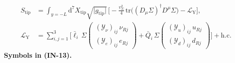 \documentclass[
  10pt,
]{article}
\begin{document}
\[
\begin{aligned}
S_{\mathrm{tip}} &= \int_{y=-L}\mathrm{d}^7X_{\mathrm{tip}}\sqrt{\lvert g_{\mathrm{tip}}\rvert}\,\Big[
 -\frac{v_\Sigma^2}{4}\,\mathrm{tr}\big((D_\mu\Sigma)^\dagger D^\mu\Sigma\big) -
 \mathcal{L}_{\mathrm{Y}}\Big],\\
\mathcal{L}_{\mathrm{Y}} &=
 \sum_{i,j=1}^{3}\Big[\bar\ell_i\,\Sigma\begin{pmatrix}(\mathcal{Y}_\nu)_{ij}\,\nu_{Rj}\\
 (\mathcal{Y}_e)_{ij}\,e_{Rj}\end{pmatrix}
 + \bar Q_i\,\Sigma\begin{pmatrix}(\mathcal{Y}_u)_{ij}\,u_{Rj}\\ (\mathcal{Y}_d)_{ij}\,d_{Rj}
 \end{pmatrix}\Big]
 + \text{h.c.}
\end{aligned} \tag{IN-13}
\] \textbf{Symbols in (IN-13).}
\end{document}
